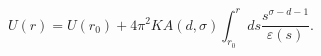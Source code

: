 \begin{equation}
\label{effpot}
U(r)=U(r_0)+4\pi^2
K A(d,\sigma)\int_{r_0}^{r}ds \frac{s^{\sigma-d-1}}{\varepsilon(s)}.
\end{equation}

